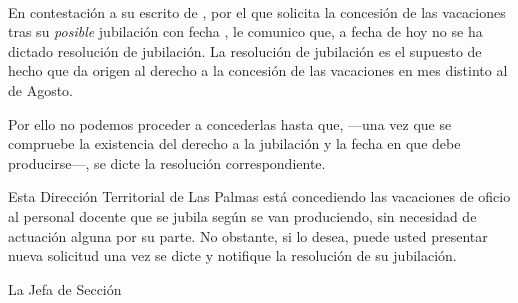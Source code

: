 \begin{flushright}
 \\ 
\end{flushright}


\noindent En contestación a su escrito de , por el que 
solicita la concesión de las vacaciones tras su \emph{posible} jubilación con 
fecha , le comunico que, a fecha de hoy no se ha dictado 
resolución de jubilación. La resolución de jubilación es el supuesto de hecho 
que da origen al derecho a la concesión de las vacaciones en mes distinto al de 
Agosto.

Por ello no podemos proceder a concederlas hasta que, ---una vez que se 
compruebe la existencia del derecho a la jubilación y la fecha en que debe 
producirse---, se dicte la resolución correspondiente. 

Esta Dirección Territorial de Las Palmas está concediendo las vacaciones de 
oficio al personal docente que se jubila según se van produciendo, sin necesidad
 de actuación alguna por su parte. No obstante, si lo desea, puede usted 
 presentar nueva solicitud una vez se dicte y notifique la resolución de su 
 jubilación.

\vspace{3ex}
\noindent La Jefa de Sección